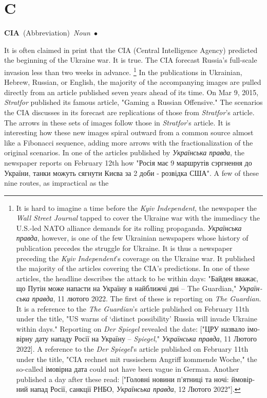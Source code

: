 \documentclass[10pt,a4paper,twoside]{article} %
\newcommand{\entry}[4]{\markboth{#1}{#1}\textbf{#1}\ {(#2)}\ \textit{#3}\ $\bullet$\ {#4}}  %
\begin{document}
\section*{C}

\begin{multicols}{2}

\entry{CIA} {Abbreviation} {Noun} {

It is often claimed in print that the CIA (Central Intelligence Agency) predicted the beginning of the Ukraine war. It is true. The CIA forecast Russia's full-scale invasion less than two weeks in advance. \footnote{ It is hard to imagine a time before the \emph{Kyiv Independent}, the newspaper the \emph{Wall Street Journal} tapped to cover the Ukraine war with the immediacy the U.S.-led NATO alliance demands for its rolling propaganda. \textukrainian{\emph{Українська правда}}, however, is one of the few Ukrainian newspapers whose history of publication precedes the struggle for Ukraine. It is thus a newspaper preceding the \emph{Kyiv Independent}'s coverage on the Ukraine war. It published the majority of the articles covering the CIA's predictions. In one of these articles, the headline describes the attack to be within days: \textukrainian{"Байден вважає, що Путін може напасти на Україну в найближчі дні} – The Guardian," \textukrainian{\emph{Українська правда}}, 11 \textukrainian{лютого} 2022. The first of these is reporting on \emph{The Guardian}. It is a reference to the \emph{The Guardian}'s article published on February 11th under the title, "US warns of ‘distinct possibility’ Russia will invade Ukraine within days." Reporting on \emph{Der Spiegel} revealed the date: ["\textukrainian{ЦРУ назвало імовірну дату нападу Росії на Україну} – \emph{Spiegel}," \textukrainian{\emph{Українська правда}}, 11 \textukrainian{Лютого} 2022]. A reference to the \emph{Der Spiegel}'s article published on February 11th under the title, "CIA rechnet mit russischem Angriff kommende Woche," the so-called \textukrainian{імовірна дата} could not have been vague in German. Another published a day after these read: ["\textukrainian{Головні новини п’ятниці та ночі: ймовірний напад Росії, санкції РНБО}, \textukrainian{\emph{Українська правда}}, 12 \textukrainian{Лютого} 2022"].} In the publications in Ukrainian, Hebrew, Russian, or English, the majority of the accompanying images are pulled directly from an article published seven years ahead of its time. On Mar 9, 2015, \emph{Stratfor} published its famous article, "Gaming a Russian Offensive." The scenarios the CIA discusses in its forecast are replications of those from \emph{Stratfor}'s article. The arrows in these sets of images follow those in \emph{Stratfor}'s article.  \newline \indent It is interesting how these new images spiral outward from a common source almost like a Fibonacci sequence, adding more arrows with the fractionalization of the original scenarios.  In one of the articles published by \textukrainian{\emph{Українська правда}}, the newspaper reports on February 12th how \textukrainian{"Росія має 9 маршрутів сэргнення до України, танки можуть сягнути Києва за 2 доби - розвідка США"}. A few of these nine routes, as impractical as the }
\end{multicols}
\end{document}
